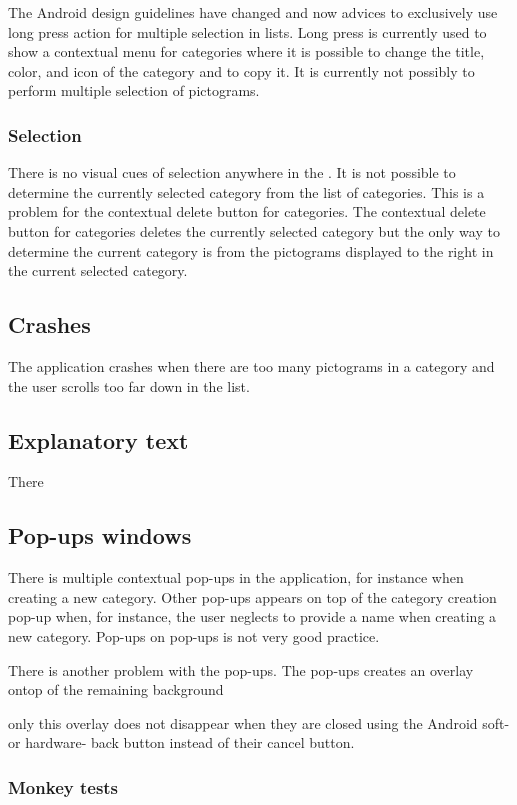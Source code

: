 The Android design guidelines have changed and now advices to exclusively use long press action for multiple selection in lists. Long press is currently used to show a contextual menu for categories where it is possible to change the title, color, and icon of the category and to copy it. It is currently not possibly to perform multiple selection of pictograms. 

\subsubsection{Selection}

There is no visual cues of selection anywhere in the \ct. It is not possible to determine the currently selected category from the list of categories. This is a problem for the contextual delete button for categories. The contextual delete button for categories deletes the currently selected category but the only way to determine the current category is from the pictograms displayed to the right in the current selected category. 

\subsection{Crashes}

The application crashes when there are too many pictograms in a category and the user scrolls too far down in the list. 

\subsection{Explanatory text}

There 

\subsection{Pop-ups windows}

There is multiple contextual pop-ups in the application, for instance when creating a new category. Other pop-ups appears on top of the category creation pop-up when, for instance, the user neglects to provide a name when creating a new category. Pop-ups on pop-ups is not very good practice.  

There is another problem with the pop-ups. The pop-ups creates an overlay ontop of the remaining background

only this overlay does not disappear when they are closed using the Android soft- or hardware- back button instead of their cancel button.
 
\subsubsection{Monkey tests}

